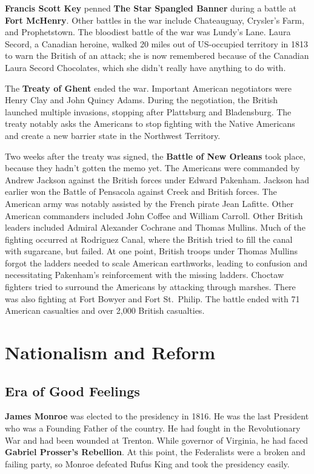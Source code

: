 \textbf{Francis Scott Key} penned \textbf{The Star Spangled Banner} during a battle at \textbf{Fort McHenry}.
Other battles in the war include Chateauguay, Crysler's Farm, and Prophetstown.
The bloodiest battle of the war was Lundy's Lane.
Laura Secord, a Canadian heroine,
walked 20 miles out of US-occupied territory in 1813 to warn the British of an attack;
she is now remembered because of the Canadian Laura Secord Chocolates,
which she didn't really have anything to do with.

The \textbf{Treaty of Ghent} ended the war.
Important American negotiators were Henry Clay and John Quincy Adams.
During the negotiation, the British launched multiple invasions, stopping after Plattsburg and Bladensburg.
The treaty notably asks the Americans to stop fighting with the Native Americans
and create a new barrier state in the Northwest Territory.

Two weeks after the treaty was signed, the \textbf{Battle of New Orleans} took place,
because they hadn't gotten the memo yet.
The Americans were commanded by Andrew Jackson against the British forces under Edward Pakenham.
Jackson had earlier won the Battle of Pensacola against Creek and British forces.
The American army was notably assisted by the French pirate Jean Lafitte.
Other American commanders included John Coffee and William Carroll.
Other British leaders included Admiral Alexander Cochrane and Thomas Mullins.
Much of the fighting occurred at Rodriguez Canal, where the British tried to fill the canal with sugarcane, but failed.
At one point, British troops under Thomas Mullins forgot the ladders needed to scale American earthworks,
leading to confusion and necessitating Pakenham's reinforcement with the missing ladders.
Choctaw fighters tried to surround the Americans by attacking through marshes.
There was also fighting at Fort Bowyer and Fort St.\ Philip.
The battle ended with 71 American casualties and over 2,000 British casualties.

\section{Nationalism and Reform}

\subsection*{Era of Good Feelings}

\textbf{James Monroe} was elected to the presidency in 1816.
He was the last President who was a Founding Father of the country.
He had fought in the Revolutionary War and had been wounded at Trenton.
While governor of Virginia, he had faced \textbf{Gabriel Prosser's Rebellion}.
At this point, the Federalists were a broken and failing party,
so Monroe defeated Rufus King and took the presidency easily.

